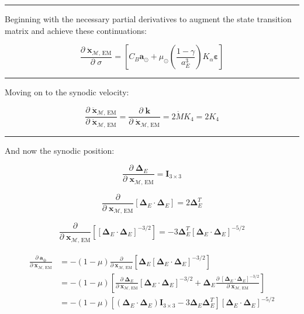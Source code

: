 \documentclass[]{article}
\newcommand{\pd}[2]{\frac{\partial\;#1}{\partial\;#2}}
\newcommand{\pddown}[2]{\frac{\partial}{\partial\;#2} \left[ #1 \right] }
\begin{document}
	\hrule \vspace{1em}
	
	Beginning with the necessary partial derivatives to augment the state transition matrix and achieve these continuations:
	
	\begin{equation}
		\pd{\ddot{\mathbf{x}}_{\mathcal{M}\text{, EM}}}{\sigma} = \left[ C_B  \mathbf{a}_{\odot} + \mu_\odot \left(\frac{1-\gamma}{a_E^3}\right) K_\alpha \boldsymbol{\varepsilon} \right]
	\end{equation}
	
	\hrule \vspace{1em}
	
	Moving on to the synodic velocity:
	
	\begin{equation*}
		\pd{\ddot{\mathbf{x}}_{\mathcal{M}\text{, EM}}}{\dot{\mathbf{x}}_{\mathcal{M}\text{, EM}}} = \pd{\mathbf{k}}{\dot{\mathbf{x}}_{\mathcal{M}\text{, EM}}} = 2 \dot{M} K_4 = 2 K_4
	\end{equation*} 
	
	\hrule \vspace{1em}
	
	And now the synodic position:
	
	\begin{equation*}
		\pd{\boldsymbol{\Delta}_E}{\mathbf{x}_{\mathcal{M}\text{, EM}}} = \mathbf{I}_{3\times 3}
	\end{equation*}
	
	\begin{equation*}
		\pddown{\boldsymbol{\Delta}_E \cdot \boldsymbol{\Delta}_E}{\mathbf{x}_{\mathcal{M}\text{, EM}}} = 2 \boldsymbol{\Delta}_E^T
	\end{equation*}
	
	\begin{equation*}
		\pddown{ [\boldsymbol{\Delta}_E \cdot \boldsymbol{\Delta}_E ]^{-3/2} }{\mathbf{x}_{\mathcal{M}\text{, EM}}} = -3 \boldsymbol{\Delta}_E^T [\boldsymbol{\Delta}_E \cdot \boldsymbol{\Delta}_E ]^{-5/2}
	\end{equation*}
	
	\begin{align}
	\begin{split}
		\pd{\mathbf{a}_{\oplus}}{ \mathbf{x}_{\mathcal{M}\text{, EM}} } 
		&= -(1-\mu) \pddown{ \boldsymbol{\Delta}_E [\boldsymbol{\Delta}_E\cdot\boldsymbol{\Delta}_E]^{-3/2} }{ \mathbf{x}_{\mathcal{M}\text{, EM}} } \\
		&= -(1-\mu) \left[ \pd{ \boldsymbol{\Delta}_E}{ \mathbf{x}_{\mathcal{M}\text{, EM}} }[\boldsymbol{\Delta}_E\cdot\boldsymbol{\Delta}_E]^{-3/2} + \boldsymbol{\Delta}_E \pd{ [\boldsymbol{\Delta}_E\cdot\boldsymbol{\Delta}_E]^{-3/2} }{ \mathbf{x}_{\mathcal{M}\text{, EM}} } \right] \\
		&= -(1-\mu) \left[ (\boldsymbol{\Delta}_E\cdot\boldsymbol{\Delta}_E) \mathbf{I}_{3\times 3} - 3 \boldsymbol{\Delta}_E \boldsymbol{\Delta}_E^T \right] [\boldsymbol{\Delta}_E \cdot \boldsymbol{\Delta}_E ]^{-5/2} \\
	\end{split}
	\end{align}
	
\end{document}
